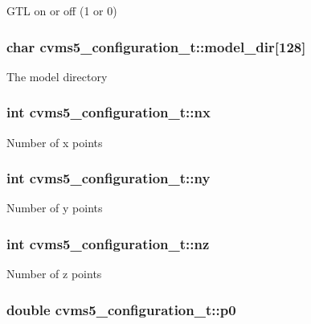 G\+T\+L on or off (1 or 0) \hypertarget{structcvms5__configuration__t_a92a1ccf6542c373b598a7a83251c4eb7}{
\subsubsection[{model\+\_\+dir}]{\setlength{\rightskip}{0pt plus 5cm}char cvms5\+\_\+configuration\+\_\+t\+::model\+\_\+dir\mbox{[}128\mbox{]}}}\label{structcvms5__configuration__t_a92a1ccf6542c373b598a7a83251c4eb7}
The model directory \hypertarget{structcvms5__configuration__t_a339993ef6d21ce0efa803d6d5e4c2520}{
\subsubsection[{nx}]{\setlength{\rightskip}{0pt plus 5cm}int cvms5\+\_\+configuration\+\_\+t\+::nx}}\label{structcvms5__configuration__t_a339993ef6d21ce0efa803d6d5e4c2520}
Number of x points \hypertarget{structcvms5__configuration__t_a7cfe5f850c6d6aa2243cac781fe59e06}{
\subsubsection[{ny}]{\setlength{\rightskip}{0pt plus 5cm}int cvms5\+\_\+configuration\+\_\+t\+::ny}}\label{structcvms5__configuration__t_a7cfe5f850c6d6aa2243cac781fe59e06}
Number of y points \hypertarget{structcvms5__configuration__t_a1c3984786f10c8851ce7e29eec6ab154}{
\subsubsection[{nz}]{\setlength{\rightskip}{0pt plus 5cm}int cvms5\+\_\+configuration\+\_\+t\+::nz}}\label{structcvms5__configuration__t_a1c3984786f10c8851ce7e29eec6ab154}
Number of z points \hypertarget{structcvms5__configuration__t_a97b754f5d51e0a8519edf02f7eed07d2}{
\subsubsection[{p0}]{\setlength{\rightskip}{0pt plus 5cm}double cvms5\+\_\+configuration\+\_\+t\+::p0}}\label{structcvms5__configuration__t_a97b754f5d51e0a8519edf02f7eed07d2}
